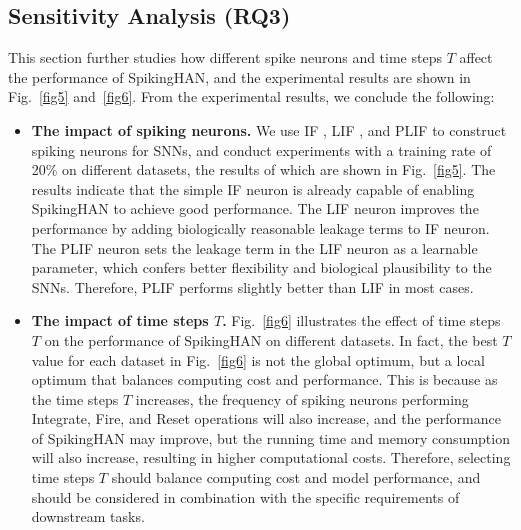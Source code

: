 \documentclass[letterpaper]{article} %
\begin{document}
\subsection{Sensitivity Analysis (RQ3)}
This section further studies how different spike neurons and time steps $T$ affect the performance of SpikingHAN, and the experimental results are shown in Fig.~\ref{fig5} and~\ref{fig6}. From the experimental results, we conclude the following: 
\begin{itemize}
    \item \textbf{The impact of spiking neurons.} We use IF \cite{bib31}, LIF \cite{bib32}, and PLIF \cite{bib33} to construct spiking neurons for SNNs, and conduct experiments with a training rate of 20\% on different datasets, the results of which are shown in Fig.~\ref{fig5}. The results indicate that the simple IF neuron is already capable of enabling SpikingHAN to achieve good performance. The LIF neuron improves the performance by adding biologically reasonable leakage terms to IF neuron. The PLIF neuron sets the leakage term in the LIF neuron as a learnable parameter, which confers better flexibility and biological plausibility to the SNNs. Therefore, PLIF performs slightly better than LIF in most cases. 
    \item \textbf{The impact of time steps $T$.} Fig.~\ref{fig6} illustrates the effect of time steps $T$ on the performance of SpikingHAN on different datasets. In fact, the best $T$ value for each dataset in Fig.~\ref{fig6} is not the global optimum, but a local optimum that balances computing cost and performance. This is because as the time steps $T$ increases, the frequency of spiking neurons performing Integrate, Fire, and Reset operations will also increase, and the performance of SpikingHAN may improve, but the running time and memory consumption will also increase, resulting in higher computational costs. Therefore, selecting time steps $T$ should balance computing cost and model performance, and should be considered in combination with the specific requirements of downstream tasks.
\end{itemize}
\end{document}
